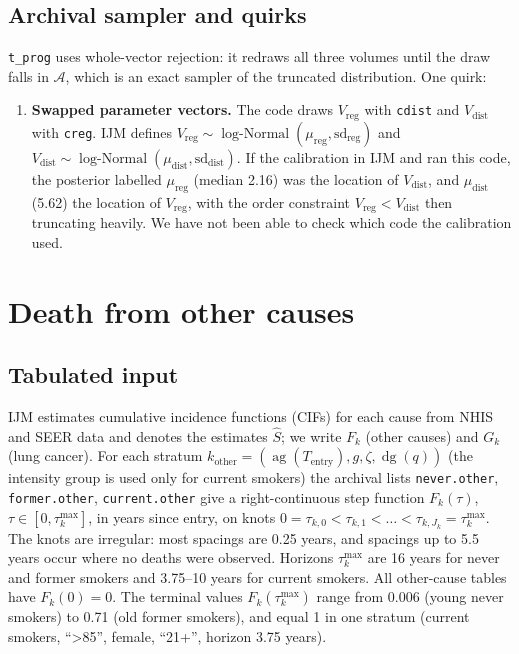 \documentclass[11pt]{article}
\newcommand{\code}[1]{\texttt{#1}}
\newcommand{\LN}{\operatorname{log\text{-}Normal}}
\newcommand{\ag}{\operatorname{ag}}
\newcommand{\dg}{\operatorname{dg}}
\newcommand{\sex}{g}
\newcommand{\Tentry}{T_{\mathrm{entry}}}
\newcommand{\Vreg}{V_{\mathrm{reg}}}
\newcommand{\Vdist}{V_{\mathrm{dist}}}
\begin{document}
\subsection{Archival sampler and quirks}
\code{t\_prog} uses whole-vector rejection: it redraws all three volumes until
the draw falls in $\mathcal{A}$, which is an exact sampler of the truncated
distribution. One quirk:
\begin{enumerate}[nosep]
\item \textbf{Swapped parameter vectors.} The code draws $\Vreg$ with
  \code{cdist} and $\Vdist$ with \code{creg}. IJM defines
  $\Vreg\sim\LN(\mu_{\mathrm{reg}},\mathrm{sd}_{\mathrm{reg}})$ and
  $\Vdist\sim\LN(\mu_{\mathrm{dist}},\mathrm{sd}_{\mathrm{dist}})$. If the
  calibration in IJM and \cite{mdm2021} ran this code, the posterior labelled
  $\mu_{\mathrm{reg}}$ (median 2.16) was the location of $\Vdist$, and
  $\mu_{\mathrm{dist}}$ (5.62) the location of $\Vreg$, with the order
  constraint $\Vreg<\Vdist$ then truncating heavily. We have not been able to
  check which code the calibration used.
\end{enumerate}
\section{Death from other causes}\label{sec:oc}

\subsection{Tabulated input}
IJM estimates cumulative incidence functions (CIFs) for each cause from NHIS and
SEER data and denotes the estimates $\hat S$; we write $F_k$ (other causes) and
$G_k$ (lung cancer). For each stratum
$k_{\mathrm{other}} = (\ag(\Tentry), \sex, \zeta, \dg(q))$ (the intensity group is
used only for current smokers) the archival lists \code{never.other},
\code{former.other}, \code{current.other} give a right-continuous step function
$F_{k}(\tau)$, $\tau\in[0,\tau^{\max}_{k}]$, in years since entry, on knots
$0=\tau_{k,0}<\tau_{k,1}<\dots<\tau_{k,J_k}=\tau^{\max}_k$. The knots are
irregular: most spacings are 0.25 years, and spacings up to 5.5 years occur where
no deaths were observed. Horizons $\tau^{\max}_k$ are 16 years for never and
former smokers and 3.75--10 years for current smokers. All other-cause tables
have $F_k(0)=0$. The terminal values $F_k(\tau^{\max}_k)$ range from 0.006
(young never smokers) to 0.71 (old former smokers), and equal 1 in one stratum
(current smokers, ``>85'', female, ``21+'', horizon 3.75 years).
\end{document}
